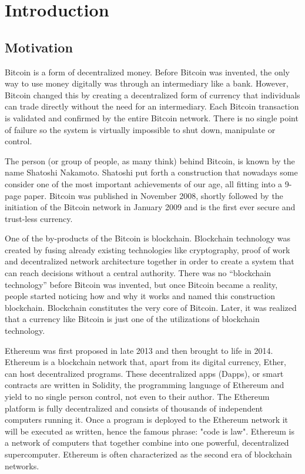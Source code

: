 \chapter{Introduction}

\section{Motivation}

Bitcoin is a form of decentralized money. Before Bitcoin was invented, the only
way to use money digitally was through an intermediary like a bank. However,
Bitcoin changed this by creating a decentralized form of currency that
individuals can trade directly without the need for an intermediary. Each
Bitcoin transaction is validated and confirmed by the entire Bitcoin network.
There is no single point of failure so the system is virtually impossible to
shut down, manipulate or control.

The person (or group of people, as many think) behind Bitcoin, is known by the
name Shatoshi Nakamoto. Shatoshi put forth a construction that nowadays some
consider one of the most important achievements of our age, all fitting into a
9-page paper.  Bitcoin was published in November 2008, shortly followed by the
initiation of the Bitcoin network in January 2009 and is the first ever secure
and trust-less currency.

One of the by-products of the Bitcoin is blockchain. Blockchain technology was
created by fusing already existing technologies like cryptography, proof of
work and decentralized network architecture together in order to create a
system that can reach decisions without a central authority. There was no
“blockchain technology” before Bitcoin was invented, but once Bitcoin became a
reality, people started noticing how and why it works and named this
construction blockchain. Blockchain constitutes the very core of Bitcoin.
Later, it was realized that a currency like Bitcoin is just one of the
utilizations of blockchain technology.

Ethereum was first proposed in late 2013 and then brought to life in 2014.
Ethereum is a blockchain network that, apart from its digital currency, Ether,
can host decentralized programs. These decentralized apps (Dapps), or smart
contracts are written in Solidity, the programming language of Ethereum and
yield to no single person control, not even to their author.  The Ethereum
platform is fully decentralized and consists of thousands of independent
computers running it. Once a program is deployed to the Ethereum network it
will be executed as written, hence the famous phrase: "code is law". Ethereum
is a network of computers that together combine into one powerful,
decentralized supercomputer. Ethereum is often characterized as the second era
of blockchain networks.

